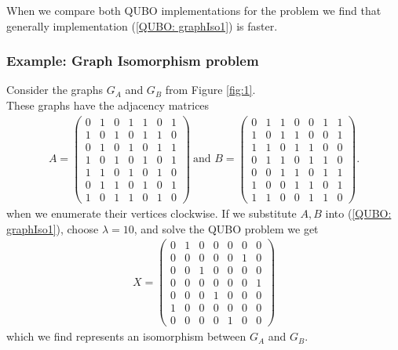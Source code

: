 \documentclass{article}
\begin{document}
\noindent When we compare both QUBO implementations for the problem we find that generally implementation (\ref{QUBO: graphIso1}) is faster.

\subsubsection{Example: Graph Isomorphism problem}
Consider the graphs \(G_A\) and \(G_B\) from Figure \ref{fig:1}. \\

\noindent These graphs have the adjacency matrices
\begin{align*}
    A = \begin{pmatrix}
        0 & 1 & 0 & 1 & 1 & 0 & 1 \\
        1 & 0 & 1 & 0 & 1 & 1 & 0 \\
        0 & 1 & 0 & 1 & 0 & 1 & 1 \\
        1 & 0 & 1 & 0 & 1 & 0 & 1 \\
        1 & 1 & 0 & 1 & 0 & 1 & 0 \\
        0 & 1 & 1 & 0 & 1 & 0 & 1 \\
        1 & 0 & 1 & 1 & 0 & 1 & 0
    \end{pmatrix} \: \text{and }
    B = \begin{pmatrix}
        0 & 1 & 1 & 0 & 0 & 1 & 1 \\
        1 & 0 & 1 & 1 & 0 & 0 & 1 \\
        1 & 1 & 0 & 1 & 1 & 0 & 0 \\
        0 & 1 & 1 & 0 & 1 & 1 & 0 \\
        0 & 0 & 1 & 1 & 0 & 1 & 1 \\
        1 & 0 & 0 & 1 & 1 & 0 & 1 \\
        1 & 1 & 0 & 0 & 1 & 1 & 0
    \end{pmatrix}.
\end{align*}
when we enumerate their vertices clockwise. If we substitute \(A, B\) into (\ref{QUBO: graphIso1}), choose \(\lambda = 10\), and solve the QUBO problem we get
\begin{align*}
    X = \begin{pmatrix}
        0 & 1 & 0 & 0 & 0 & 0 & 0 \\
        0 & 0 & 0 & 0 & 0 & 1 & 0 \\
        0 & 0 & 1 & 0 & 0 & 0 & 0 \\
        0 & 0 & 0 & 0 & 0 & 0 & 1 \\
        0 & 0 & 0 & 1 & 0 & 0 & 0 \\
        1 & 0 & 0 & 0 & 0 & 0 & 0 \\
        0 & 0 & 0 & 0 & 1 & 0 & 0
    \end{pmatrix}
\end{align*}
which we find represents an isomorphism between \(G_A\) and \(G_B\).\\
\end{document}

